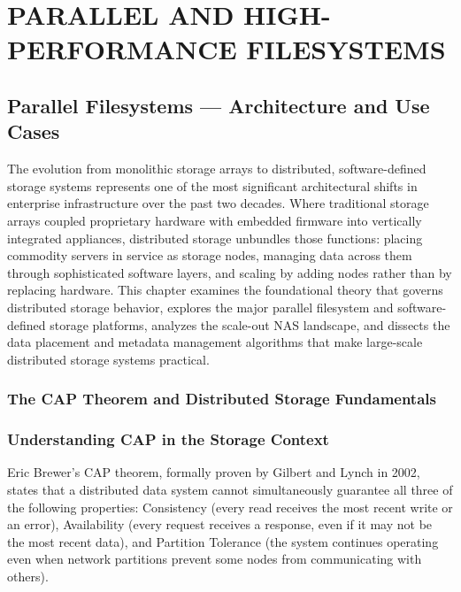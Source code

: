 \part{PARALLEL AND HIGH-PERFORMANCE FILESYSTEMS}

\chapter{Parallel Filesystems --- Architecture and Use Cases}
\label{ch:8}


The evolution from monolithic storage arrays to distributed, software-defined storage systems represents one of the most significant architectural shifts in enterprise infrastructure over the past two decades. Where traditional storage arrays coupled proprietary hardware with embedded firmware into vertically integrated appliances, distributed storage unbundles those functions: placing commodity servers in service as storage nodes, managing data across them through sophisticated software layers, and scaling by adding nodes rather than by replacing hardware. This chapter examines the foundational theory that governs distributed storage behavior, explores the major parallel filesystem and software-defined storage platforms, analyzes the scale-out NAS landscape, and dissects the data placement and metadata management algorithms that make large-scale distributed storage systems practical.

\section{The CAP Theorem and Distributed Storage Fundamentals}
\section{Understanding CAP in the Storage Context}
Eric Brewer's CAP theorem, formally proven by Gilbert and Lynch in 2002, states that a distributed data system cannot simultaneously guarantee all three of the following properties: Consistency (every read receives the most recent write or an error), Availability (every request receives a response, even if it may not be the most recent data), and Partition Tolerance (the system continues operating even when network partitions prevent some nodes from communicating with others).

